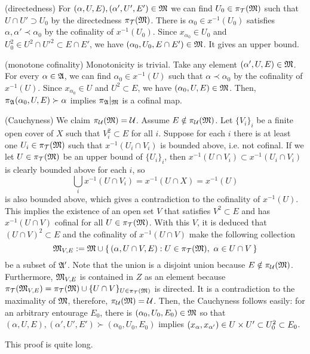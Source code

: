 \documentclass{../exp}
\begin{document}
\begin{pf}[1 of Theorem 1.1]
(directedness)
For $(\alpha,U,E),(\alpha',U',E')\in\mathfrak{M}$ we can find $U_0\in\pi_{\mathcal{T}}(\mathfrak{M})$ such that $U\cap U'\supset U_0$ by the directedness $\pi_{\mathcal{T}}(\mathfrak{M})$.
There is $\alpha_0\in x^{-1}(U_0)$ satisfies $\alpha,\alpha'\prec\alpha_0$ by the cofinality of $x^{-1}(U_0)$.
Since $x_{\alpha_0}\in U_0$ and $U_0^2\in U^2\cap U'^2\subset E\cap E'$, we have $(\alpha_0,U_0,E\cap E')\in\mathfrak{M}$.
It gives an upper bound.

(monotone cofinality)
Monotonicity is trivial.
Take any element $(\alpha',U,E)\in\mathfrak{M}$.
For every $\alpha\in\mathfrak{A}$, we can find $\alpha_0\in x^{-1}(U)$ such that $\alpha\prec\alpha_0$ by the cofinality of $x^{-1}(U)$.
Since $x_{\alpha_0}\in U$ and $U^2\subset E$, we have $(\alpha_0,U,E)\in\mathfrak{M}$.
Then, $\pi_{\mathfrak{A}}(\alpha_0,U,E)\succ\alpha$ implies $\pi_{\mathfrak{A}}|_{\mathfrak{M}}$ is a cofinal map.

(Cauchyness)
We claim $\pi_{\mathcal{U}}(\mathfrak{M})=\mathcal{U}$.
Assume $E\notin\pi_{\mathcal{U}}(\mathfrak{M})$.
Let $\{V_i\}_i$ be a finite open cover of $X$ such that $V_i^2\subset E$ for all $i$.
Suppose for each $i$ there is at least one $U_i\in\pi_{\mathcal{T}}(\mathfrak{M})$ such that $x^{-1}(U_i\cap V_i)$ is bounded above, i.e. not cofinal.
If we let $U\in\pi_{\mathcal{T}}(\mathfrak{M})$ be an upper bound of $\{U_i\}_i$, then $x^{-1}(U\cap V_i)\subset x^{-1}(U_i\cap V_i)$ is clearly bounded above for each $i$, so
\[\bigcup_ix^{-1}(U\cap V_i)=x^{-1}(U\cap X)=x^{-1}(U)\]
is also bounded above, which gives a contradiction to the cofinality of $x^{-1}(U)$.
This implies the existence of an open set $V$ that satisfies $V^2\subset E$ and has $x^{-1}(U\cap V)$ cofinal for all $U\in\pi_{\mathcal{T}}(\mathfrak{M})$.
With this $V$, it is deduced that $(U\cap V)^2\subset E$ and the cofinality of $x^{-1}(U\cap V)$ make the following collection
\[\mathfrak{M}_{V,E}:=\mathfrak{M}\cup\{\,(\alpha,U\cap V,E):U\in\pi_{\mathcal{T}}(\mathfrak{M}),\ \alpha\in U\cap V\,\}\]
be a subset of $\mathfrak{A}'$.
Note that the union is a disjoint union because $E\notin\pi_{\mathcal{U}}(\mathfrak{M})$.
Furthermore, $\mathfrak{M}_{V,E}$ is contained in $Z$ as an element because $\pi_{\mathcal{T}}(\mathfrak{M}_{V,E})=\pi_{\mathcal{T}}(\mathfrak{M})\cup\{U\cap V\}_{U\in\pi_{\mathcal{T}}(\mathfrak{M})}$ is directed.
It is a contradiction to the maximality of $\mathfrak{M}$, therefore, $\pi_{\mathcal{U}}(\mathfrak{M})=\mathcal{U}$.
Then, the Cauchyness follows easily: for an arbitrary entourage $E_0$, there is $(\alpha_0,U_0,E_0)\in\mathfrak{M}$ so that $(\alpha,U,E),(\alpha',U',E')\succ(\alpha_0,U_0,E_0)$ implies $(x_\alpha,x_{\alpha'})\in U\times U'\subset U_0^2\subset E_0$.
\end{pf}

This proof is quite long.
\end{document}
